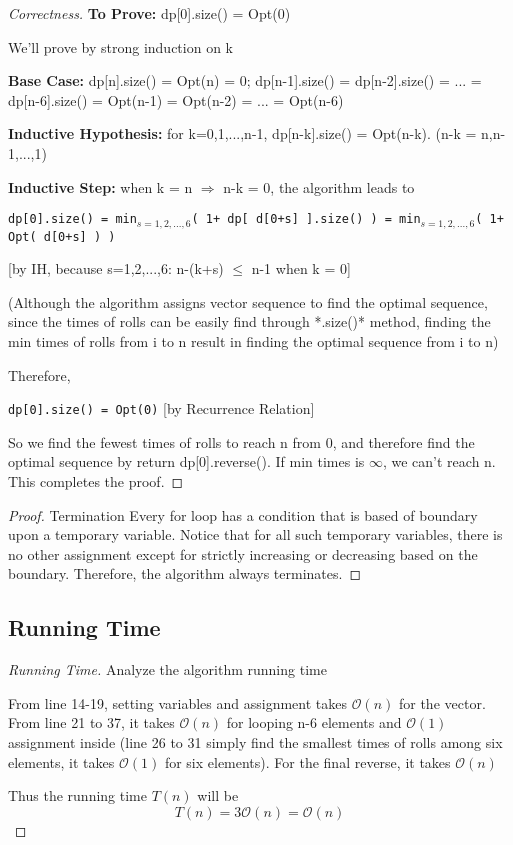 \documentclass[openany]{article}
\begin{document}
\begin{proof}[Correctness]{}
    \textbf{To Prove:} dp[0].size() = Opt(0)
    
    We'll prove by strong induction on k
    
    \textbf{Base Case:} dp[n].size() = Opt(n) = 0; dp[n-1].size() = dp[n-2].size() = ... = dp[n-6].size() = Opt(n-1) = Opt(n-2) = ... = Opt(n-6)
    
    \textbf{Inductive Hypothesis:} for k=0,1,...,n-1, dp[n-k].size() = Opt(n-k). (n-k = n,n-1,...,1)
    
    \textbf{Inductive Step:} when k = n $\Rightarrow$ n-k = 0, the algorithm leads to
    \begin{center}
        \texttt{dp[0].size() = min$_{s=1,2,...,6}$( 1+ dp[ d[0+s] ].size() ) = min$_{s=1,2,...,6}$( 1+ Opt( d[0+s] ) )}
    \end{center}
    [by IH, because s=1,2,...,6: n-(k+s) $\leq$ n-1 when k = 0]

    (Although the algorithm assigns vector sequence to find the optimal sequence, since the times of rolls can be easily find through *.size()* method, finding the min times of rolls from i to n result in finding the optimal sequence from i to n)
    
    Therefore,
    \begin{center}
        \texttt{dp[0].size() = Opt(0)} [by Recurrence Relation]
    \end{center}
    
    So we find the fewest times of rolls to reach n from 0, and therefore find the optimal sequence by return dp[0].reverse(). If min times is $\infty$, we can't reach n. This completes the proof.

\end{proof}
\begin{proof}{Termination}
    Every for loop has a condition that is based of boundary upon a temporary variable. Notice that for all such temporary variables, there is no other assignment except for strictly increasing or decreasing based on the boundary. Therefore, the algorithm always terminates.
\end{proof}

\subsection*{Running Time}
\begin{proof}[Running Time]{Analyze the algorithm running time}
    	\renewcommand{\qedsymbol}{}
    	
    	From line 14-19, setting variables and assignment takes $\mathcal{O}(n)$ for the vector. From line 21 to 37, it takes $\mathcal{O}(n)$ for looping n-6 elements and $\mathcal{O}(1)$ assignment inside (line 26 to 31 simply find the smallest times of rolls among six elements, it takes $\mathcal{O}(1)$ for six elements). For the final reverse, it takes $\mathcal{O}(n)$
    	
    	Thus the running time $T(n)$ will be \[T(n)=3\mathcal{O}(n)=\mathcal{O}(n)\]
\end{proof}
\end{document}

